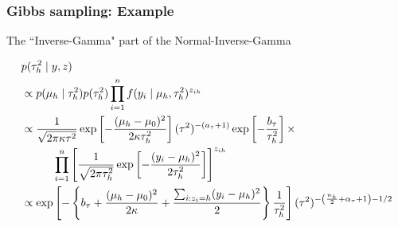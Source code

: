 \documentclass{beamer}
\begin{document}
\begin{frame}[fragile]
\frametitle{Gibbs sampling: Example}

The ``Inverse-Gamma" part of the Normal-Inverse-Gamma 

\begin{align*}
&p(\tau^2_h \mid  y, z) \\
&\propto p(\mu_h \mid \tau^2_{h})p(\tau^2_{h})  \prod_{i=1}^n   f(y_i \mid \mu_h, \tau^2_h)^{z_{ih}}\\
&\propto \frac{1}{\sqrt{2\pi \kappa \tau^2  }}\exp\left[-\frac{(\mu_{h} -  \mu_0)^2 }{ 2\kappa \tau_h^2 } \right] (\tau^2)^{-(a_{\tau}+1) } \exp\left[ - \frac{b_{\tau}}{\tau_h^2} \right] \times\\
&\hspace{10mm}\prod_{i=1}^n \left[ \frac{1}{\sqrt{2\pi \tau^2_{h} }}\exp\left[-\frac{(y_i - \mu_{h} )^2 }{ 2\tau^2_{h} } \right] \right]^{z_{ih}} \\
&\propto \exp\left[-\left\{ b_\tau +  \frac{(\mu_{h} -  \mu_0)^2 }{ 2\kappa  }  + \frac{\sum_{i : z_i = h}(y_i - \mu_{h} )^2 }{ 2 } \right\} \frac{1}{\tau^2_h} \right] (\tau^2)^{-\left( \frac{n_h}{2} + \alpha_{\tau} + 1 \right)-1/2 }
\end{align*}

\end{frame}
\end{document}
